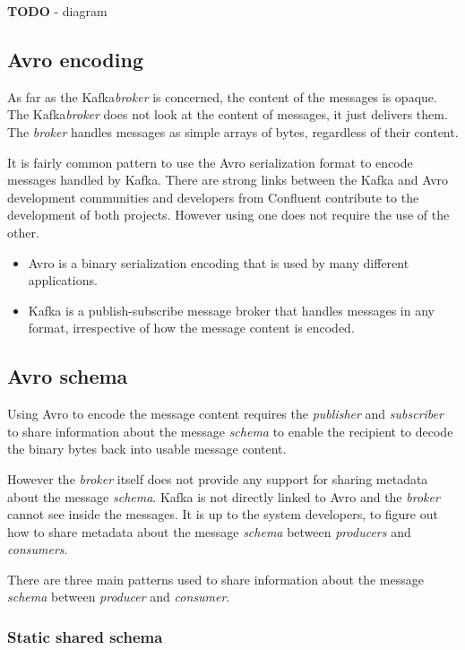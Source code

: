 \documentclass{article}
\newcommand{\avro} {Avro\xspace}
\newcommand{\kafka} {Kafka\xspace}
\newcommand{\kfbroker} {\textit{broker}\xspace}
\newcommand{\kfconsumer} {\textit{consumer}\xspace}
\newcommand{\kfconsumers} {\textit{consumers}\xspace}
\newcommand{\kfproducer} {\textit{producer}\xspace}
\newcommand{\kfproducers} {\textit{producers}\xspace}
\newcommand{\kfpublisher} {\textit{publisher}\xspace}
\newcommand{\kfsubscriber} {\textit{subscriber}\xspace}
\newcommand{\confluent} {Confluent\xspace}
\newcommand{\avschema} {\textit{schema}\xspace}
\begin{document}
\textbf{TODO} - diagram

\subsection{Avro encoding}
\label{avro-encoding}

As far as the \kafka \kfbroker is concerned, the content of the messages is opaque. The \kafka \kfbroker does not look at the content of messages, it just delivers them.
The \kfbroker handles messages as simple arrays of bytes, regardless of their content.

It is fairly common pattern to use the  \avro serialization format to encode messages handled by \kafka.
There are strong links between the \kafka and \avro development 
communities and developers from \confluent contribute to the development of both projects.
However using one does not require the use of the other.

\begin{itemize}
    \item \avro is a binary serialization encoding that is used by many different applications.
    \item \kafka is a publish-subscribe message broker that handles messages in any format, irrespective of how the message content is encoded.
\end{itemize}

\subsection{Avro schema}
\label{avro-schema}

Using \avro to encode the message content requires the \kfpublisher and \kfsubscriber to share information about the message \avschema to enable the recipient to decode the binary bytes back into usable message content.

However the \kfbroker itself does not provide any support for sharing metadata about the message \avschema. \kafka is not directly linked to \avro and the \kfbroker cannot see inside the messages. It is up to the system developers, to figure out how to share metadata about the message \avschema between \kfproducers and \kfconsumers. 

There are three main patterns used to share information about the message \avschema between \kfproducer and \kfconsumer.

\subsubsection{Static shared schema}
\label{avro-static-schema}
\end{document}
